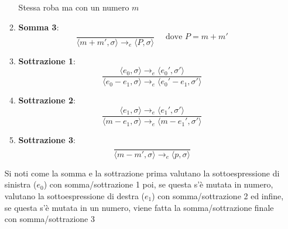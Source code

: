 \begin{itemize}
\begin{enumerate}
\[        \]
        Stessa roba ma con un numero $m$
        \item \textbf{Somma 3}:
        \[
            \frac{}{\langle m+m', \sigma \rangle \rightarrow_e \langle P, \sigma \rangle}   \quad \text{ dove } P = m+m' 
        \]
        \item \textbf{Sottrazione 1}:
        \[
            \frac{\langle e_0, \sigma \rangle \rightarrow_e \langle e_0', \sigma' \rangle}{\langle e_0 - e_1, \sigma \rangle \rightarrow_e \langle e_0' - e_1, \sigma' \rangle}
        \]
        \item \textbf{Sottrazione 2}:
        \[
            \frac{\langle e_1, \sigma \rangle \rightarrow_e \langle e_1', \sigma' \rangle}{\langle m - e_1, \sigma \rangle \rightarrow_e \langle m - e_1', \sigma' \rangle}
        \]
        \item \textbf{Sottrazione 3}:
        \[
            \frac{}{\langle m - m', \sigma \rangle \rightarrow_e \langle p, \sigma \rangle}
        \]
        
   

    \end{enumerate}

    Si noti come la somma e la sottrazione prima valutano la sottoespressione di sinistra ($e_0$) con somma/sottrazione 1 poi, se questa s'è mutata in numero, valutano la sottoespressione di destra ($e_1$) con somma/sottrazione 2 ed infine, se questa s'è mutata in un numero, viene fatta la somma/sottrazione finale con somma/sottrazione 3

\end{itemize}

